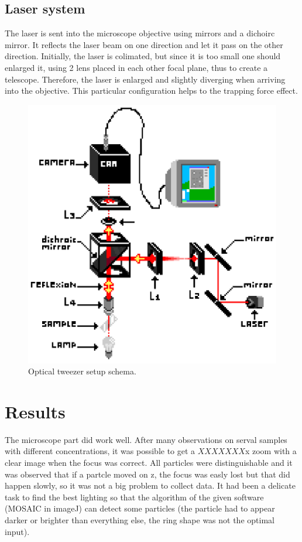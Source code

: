 \documentclass[a4paper,12pt,twoside]{article}	%
\begin{document}
\subsection{Laser system}
The laser is sent into the microscope objective using mirrors and a dichoirc mirror. It reflects the laser beam on one direction and let it pass on the other direction.
Initially, the laser is colimated, but since it is too small one should enlarged it, using 2 lens placed in each other focal plane, thus to create a telescope. Therefore, the laser is enlarged and slightly diverging when arriving into the objective. This particular configuration helps to the trapping force effect.

\begin{figure}[h]
	\begin{center}
		\includegraphics[width=0.6\linewidth,angle=0]{./figures/montage_1}
		\caption{Optical tweezer setup schema.} \label{fig:dispositif}
	\end{center}
\end{figure}

\section{Results}

The microscope part did work well. After many observations on serval samples with different concentrations, it was possible to get a $XXXXXXX $x zoom with a clear image when the focus was correct. All particles were distinguishable and it was observed that if a partcle moved on z, the focus was easly lost but that did happen slowly, so it was not a big problem to collect data. It had been a delicate task to find the best lighting so that the algorithm of the given software (MOSAIC in imageJ) can detect some particles (the particle had to appear darker or brighter than everything else, the ring shape was not the optimal input).
\end{document}
